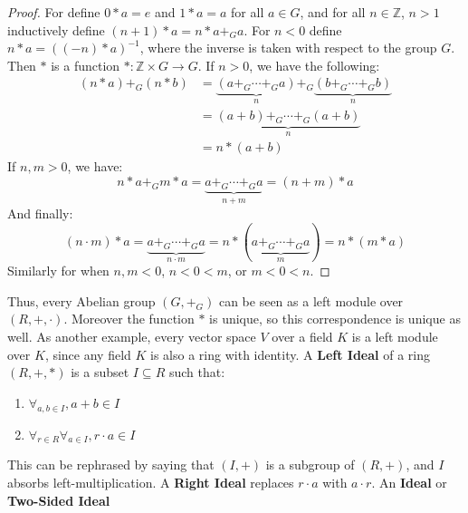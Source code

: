     \begin{proof}
        For define $0*a=e$ and $1*a=a$ for all $a\in{G}$,
        and for all
        $n\in\mathbb{Z}$, $n>1$ inductively define
        $(n+1)*a=n*a+_{G}a$. For $n<0$ define
        $n*a=((-n)*a)^{-1}$, where the inverse is taken
        with respect to the group $G$. Then $*$ is a function
        $*:\mathbb{Z}\times{G}\rightarrow{G}$. If $n>0$, we
        have the following:
        \begin{align*}
            (n*a)+_{G}(n*b)
            &=\underset{n}{\underbrace{(a+_{G}\cdots+_{G}a)}}
            +_{G}
            \underset{n}{\underbrace{(b+_{G}\cdots+_{G}b)}}\\
            &=\underset{n}
                {\underbrace{(a+b)+_{G}\cdots+_{G}(a+b)}}\\
            &=n*(a+b)
        \end{align*}
        If $n,m>0$, we have:
        \begin{equation*}
            n*a+_{G}m*a
            =\underset{n+m}{\underbrace{a+_{G}\cdots+_{G}a}}
            =(n+m)*a
        \end{equation*}
        And finally:
        \begin{equation*}
            (n\cdot{m})*a=
            \underset{n\cdot{m}}
                {\underbrace{a+_{G}\cdots+_{G}a}}
            =n*(\underset{m}{\underbrace{a+_{G}\cdots+_{G}a}})
            =n*(m*a)
        \end{equation*}
        Similarly for when $n,m<0$, $n<0<m$, or $m<0<n$.
    \end{proof}
    Thus, every Abelian group $(G,+_{G})$ can be seen
    as a left module over $(R,+,\cdot)$. Moreover the
    function $*$ is unique, so this correspondence is
    unique as well. As another example, every vector space
    $V$ over a field $K$ is a left module over $K$, since
    any field $K$ is also a ring with identity.
    A \textbf{Left Ideal} of a ring $(R,+,*)$ is a subset
    $I\subseteq{R}$ such that:
    \begin{enumerate}
        \item $\forall_{a,b\in{I}},a+b\in{I}$
        \item $\forall_{r\in{R}}\forall_{a\in{I}},%
               r\cdot{a}\in{I}$
    \end{enumerate}
    This can be rephrased by saying that $(I,+)$ is a subgroup
    of $(R,+)$, and $I$ absorbs left-multiplication. A
    \textbf{Right Ideal} replaces $r\cdot{a}$ with
    $a\cdot{r}$. An \textbf{Ideal} or \textbf{Two-Sided Ideal}
